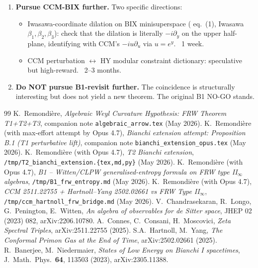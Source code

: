 \documentclass[11pt,a4paper]{article}
\theoremstyle{definition}
\begin{document}
\begin{enumerate}
  \item \textbf{Pursue CCM-BIX further.} Two specific directions:
  \begin{itemize}
    \item Iwasawa-coordinate dilation on BIX minisuperspace
    (\cite{HartnollYang2025} eq.~(1), Iwasawa $\beta_1, \beta_2,
    \beta_3$): check that the dilation is literally
    $-i \partial_y$ on the upper half-plane, identifying with
    CCM's $-i u \partial_u$ via $u = e^y$. ~1 week.
    \item CCM perturbation $\leftrightarrow$ HY modular constraint
    dictionary: speculative but high-reward. ~2--3 months.
  \end{itemize}
  \item \textbf{Do NOT pursue B1-revisit further.} The coincidence is
  structurally interesting but does not yield a new theorem. The
  original B1 NO-GO stands.
\end{enumerate}

\begin{thebibliography}{99}
K.\ Remondi\`ere, \emph{Algebraic Weyl Curvature Hypothesis: FRW Theorem
T1+T2+T3}, companion note \texttt{algebraic\_arrow.tex} (May 2026).
K.\ Remondi\`ere (with max-effort attempt by Opus 4.7), \emph{Bianchi
extension attempt: Proposition B.1 (T1 perturbative lift)}, companion note
\texttt{bianchi\_extension\_opus.tex} (May 2026).
K.\ Remondi\`ere (with Opus 4.7), \emph{T2 Bianchi extension},
\texttt{/tmp/T2\_bianchi\_extension.\{tex,md,py\}} (May 2026).
K.\ Remondi\`ere (with Opus 4.7), \emph{B1 -- Witten/CLPW
generalised-entropy formula on FRW type II$_\infty$ algebras},
\texttt{/tmp/B1\_frw\_entropy.md} (May 2026).
K.\ Remondi\`ere (with Opus 4.7), \emph{CCM 2511.22755 + Hartnoll--Yang
2502.02661 vs FRW Type II$_\infty$},
\texttt{/tmp/ccm\_hartnoll\_frw\_bridge.md} (May 2026).
V.\ Chandrasekaran, R.\ Longo, G.\ Penington, E.\ Witten, \emph{An algebra
of observables for de Sitter space}, JHEP 02 (2023) 082, arXiv:2206.10780.
A.\ Connes, C.\ Consani, H.\ Moscovici, \emph{Zeta Spectral Triples},
arXiv:2511.22755 (2025).
S.A.\ Hartnoll, M.\ Yang, \emph{The Conformal Primon Gas at the End
of Time}, arXiv:2502.02661 (2025).
R.\ Banerjee, M.\ Niedermaier, \emph{States of Low Energy on Bianchi I
spacetimes}, J.\ Math.\ Phys.\ \textbf{64}, 113503 (2023),
arXiv:2305.11388.
\end{thebibliography}
\end{document}
